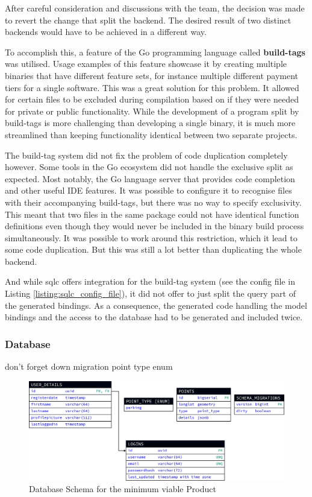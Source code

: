 After careful consideration and discussions with the team, the decision was made
to revert the change that split the backend. The desired result of two distinct
backends would have to be achieved in a different way.

To accomplish this, a feature of the Go programming language called
\textbf{build-tags} was utilised. Usage examples of this feature showcase it by
creating multiple binaries that have different feature sets, for instance
multiple different payment tiers for a single software. This was a great
solution for this problem. It allowed for certain files to be excluded during
compilation based on if they were needed for private or public functionality.
While the development of a program split by build-tags is more challenging
than developing a single binary, it is much more streamlined than keeping
functionality identical between two separate projects.

The build-tag system did not fix the problem of code duplication completely
however. Some tools in the Go ecosystem did not handle the exclusive split as
expected. Most notably, the Go language server that provides code completion and
other useful IDE features. It was possible to configure it to recognise files
with their accompanying build-tags, but there was no way to specify exclusivity.
This meant that two files in the same package could not have identical function
definitions even though they would never be included in the binary build process
simultaneously. It was possible to work around this restriction, which it lead
to some code duplication. But this was still a lot better than duplicating the
whole backend.

And while sqlc offers integration for the build-tag system (see the config file
in Listing \ref{listing:sqlc_config_file}), it did not offer to just split the
query part of the generated bindings. As a consequence, the generated code
handling the model bindings and the access to the database had to be generated
and included twice.

\subsubsection{Database}
don't forget down migration point type enum

\begin{figure}[htbp]
  \centering{}
  \includegraphics[width=\textwidth]{../d2-diagrams/database-init/database-init.png}
  \caption{Database Schema for the minimum viable Product}
  \label{fig:database_init_schema}
\end{figure}

